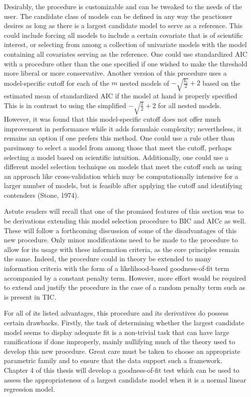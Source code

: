 		Desirably, the procedure is customizable and can be tweaked to the needs of the user. The candidate class of models can be defined in any way the practioner desires
		as long as there is a largest candidate model to serve as a reference. This could include forcing all models to include a certain covariate that is of scientific
		interest, or selecting from among a collection of univariate models with the model containing all covariates serving as the reference. One could use standardized
		AIC with a procedure other than the one specified if one wished to make the threshold more liberal or more conservative. Another version of this procedure uses a model-specific
		cutoff for each of the $m$ nested models of $-\sqrt{\frac{k_i}{2}} + 2$ based on the estimated mean of standardized AIC if the model at hand is properly specified
		This is in contrast to using the simplified $-\sqrt{\frac{1}{2}} + 2$ for all nested models. However, it was found that this model-specific cutoff does not offer much improvement in performance
		while it adds formulaic complexity; nevertheless, it remains an option if one prefers this method. One could use a rule other than parsimony to select a model
		from among those that meet the cutoff, perhaps selecting a model based on scientific intuition. Additionally, one could use a different model selection technique on
		models that meet the cutoff such as using an approach like cross-validation which may be computationally intensive for a larger number of models, but is feasible after
		applying the cutoff and identifying contenders (Stone, 1974).

		Astute readers will recall that one of the promised features of this section was to be derivations extending this model selection procedure to BIC and
		AICc as well. These will follow a forthcoming discussion of some of the disadvantages of this new procedure. Only minor modifications need to be made to the
		procedure to allow for its usage with these information criteria, as the core principles remain the same. Indeed, the procedure could in theory be extended to
		many information criteria with the form of a likelihood-based goodness-of-fit term accompanied by a constant penalty term. However, more effort would be required
		to extend and justify the procedure in the case of a random penalty term such as is present in TIC.

		For all of its listed advantages, this procedure and its derivatives do possess certain drawbacks. Firstly, the task of determining whether the largest candidate
		model seems to display adequate fit is a non-trivial task that can have large ramifications if done improperly, mainly nullifying much of the theory used to develop this
		new procedure. Great care must be taken to choose an appropriate parametric family and to ensure that the data support such a framework. Chapter 4 of this thesis will
		develop a goodness-of-fit test which can be used to assess the appropriateness of a largest candidate model when it is a normal linear regression model.

